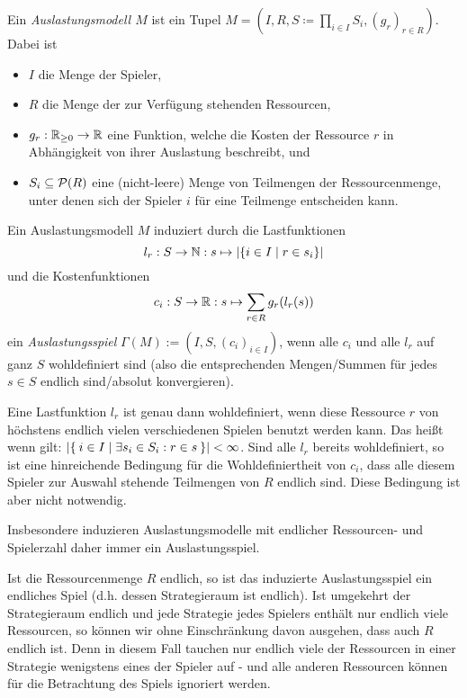\begin{defn}\label{def:Auslastungsmodel}
	Ein \emph{Auslastungsmodell $M$} ist ein Tupel $M = (I, R, S \coloneqq \prod_{i\in I} S_i, (g_r)_{r \in R})$. Dabei ist
	\begin{itemize}
		\item $I$ die Menge der Spieler,
		\item $R$ die Menge der zur Verfügung stehenden Ressourcen,
		\item $g_r: \mathbb{R}_{\geq 0} \to \mathbb{R}$ eine Funktion, welche die Kosten der Ressource $r$ in Abhängigkeit von ihrer Auslastung beschreibt, und
		\item $S_i \subseteq \mathcal{P}(R)$ eine (nicht-leere) Menge von Teilmengen der Ressourcenmenge, unter denen sich der Spieler $i$ für eine Teilmenge entscheiden kann. 
	\end{itemize}
\end{defn}

\begin{defn}\label{def:Auslastungsspiel}
	Ein Auslastungsmodell $M$ induziert durch die Lastfunktionen
		\[l_r: S \to \mathbb{N}: s \mapsto \left|\{i\in I \mid r \in s_i\}\right|\]
	und die Kostenfunktionen
		\[c_i: S \to \mathbb{R}: s \mapsto \sum_{r \in R} g_r(l_r(s)) \]
	ein \emph{Auslastungsspiel} $\Gamma(M) := (I, S, (c_i)_{i \in I})$, wenn alle $c_i$ und alle $l_r$ auf ganz $S$ wohldefiniert sind (also die entsprechenden Mengen/Summen für jedes $s \in S$ endlich sind/absolut konvergieren).
\end{defn}

\begin{bem}\label{bem:AuslSpielWohldefiniertheit}
	Eine Lastfunktion $l_r$ ist genau dann wohldefiniert, wenn diese Ressource $r$ von höchstens endlich vielen verschiedenen Spielen benutzt werden kann. Das heißt wenn gilt: $\left|\Set{i \in I | \exists s_i \in S_i: r \in s}\right| < \infty$. Sind alle $l_r$ bereits wohldefiniert, so ist eine hinreichende Bedingung für die Wohldefiniertheit von $c_i$, dass alle diesem Spieler zur Auswahl stehende Teilmengen von $R$ endlich sind. Diese Bedingung ist aber nicht notwendig.
	
	Insbesondere induzieren Auslastungsmodelle mit endlicher Ressourcen- und Spielerzahl daher immer ein Auslastungsspiel.
	
	Ist die Ressourcenmenge $R$ endlich, so ist das induzierte Auslastungsspiel ein endliches Spiel (d.h. dessen Strategieraum ist endlich). Ist umgekehrt der Strategieraum endlich und jede Strategie jedes Spielers enthält nur endlich viele Ressourcen, so können wir ohne Einschränkung davon ausgehen, dass auch $R$ endlich ist. Denn in diesem Fall tauchen nur endlich viele der Ressourcen in einer Strategie wenigstens eines der Spieler auf - und alle anderen Ressourcen können für die Betrachtung des Spiels ignoriert werden.
\end{bem}

